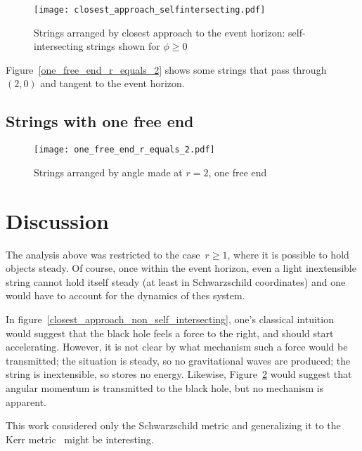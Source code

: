 \documentclass[times,twocolumn,final]{elsarticle}
\begin{document}
\begin{figure}[h!]
\centering
\texttt{[image: closest\_approach\_selfintersecting.pdf]}
\caption{Strings arranged by closest approach to the event horizon:
 self-intersecting strings shown for $\phi\geq 0$}
\label{closest_approach_self_intersecting}
\end{figure}

Figure~\ref{one_free_end_r_equals_2} shows some strings that pass
through~$\left(2,0\right)$ and tangent to the event horizon.

\subsection{Strings with one free end}

\begin{figure}[h!]
\centering
\texttt{[image: one\_free\_end\_r\_equals\_2.pdf]}
\caption{Strings arranged by angle made at $r=2$, one free end}
\label{one_free_end}
\end{figure}


\section{Discussion}


The analysis above was restricted to the case~$r\geq 1$, where it is
possible to hold objects steady.  Of course, once within the event
horizon, even a light inextensible string cannot hold itself steady
(at least in Schwarzschild coordinates) and one would have to account
for the dynamics of thes system.

In figure~\ref{closest_approach_non_self_intersecting}, one's
classical intuition would suggest that the black hole feels a force to
the right, and should start accelerating.  However, it is not clear by
what mechanism such a force would be transmitted; the situation is
steady, so no gravitational waves are produced; the string is
inextensible, so stores no energy.  Likewise,
Figure~\ref{one_free_end} would suggest that angular momentum is
transmitted to the black hole, but no mechanism is apparent.

This work considered only the Schwarzschild metric and generalizing it
to the Kerr metric~\cite{asdfsadfasfd} might be interesting.  




\end{document}
